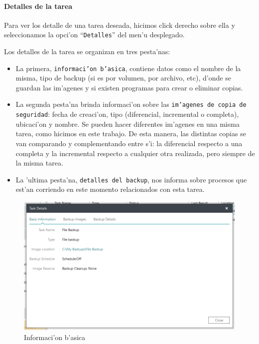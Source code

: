 \documentclass[11pt]{article}
\begin{document}
	\paragraph{Detalles de la tarea}
	
	Para ver los detalle de una tarea deseada, hicimos click derecho sobre ella y seleccionamos la opci'on ``\texttt{Detalles}'' del men'u desplegado. 
    
    Los detalles de la tarea se organizan en tres pesta'nas:
	
	\begin{itemize}
		\item {La primera, \texttt{informaci'on b'asica}, contiene datos como el nombre de la misma, tipo de backup (si es por volumen, por archivo, etc), d'onde se guardan las im'agenes y si existen programas para crear o eliminar copias.}
		
		\item{La segunda pesta'na brinda informaci'on sobre las \texttt{im'agenes de copia de seguridad}: fecha de creaci'on, tipo (diferencial, incremental o completa), ubicaci'on y nombre. Se pueden hacer diferentes im'agenes en una misma tarea, como hicimos en este trabajo. De esta manera, las distintas copias se van comparando y complementando entre s'i: la diferencial respecto a una completa y la incremental respecto a cualquier otra realizada, pero siempre de la misma tarea.}
		\item{La 'ultima pesta'na, \texttt{detalles del backup}, nos informa sobre procesos que est'an corriendo en este momento relacionados con esta tarea.}
	\end{itemize}
	
    \begin{figure}[]
		\centering
		\includegraphics[scale=.56]{Images/easeus/pendrive/17-t2_d1.png}
		\caption{Informaci'on b'asica}
	\end{figure}
	
\end{document}
